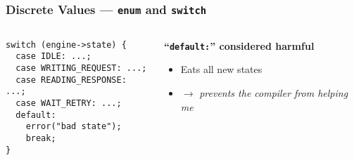 \begin{frame}[fragile]
  \frametitle{Discrete Values --- \texttt{enum} and \texttt{switch}}

  \begin{columns}[t]

    \begin{column}{.5\textwidth}

      \begin{block}{}
\begin{verbatim}
switch (engine->state) {
  case IDLE: ...;
  case WRITING_REQUEST: ...;
  case READING_RESPONSE: ...;
  case WAIT_RETRY: ...;
  default:
    error("bad state");
    break;
}
\end{verbatim}
      \end{block}

    \end{column}

    \begin{column}{.4\textwidth}

      \textbf{``\texttt{default:}'' considered harmful}

      \begin{itemize}
      \item Eats all new states
      \item $\to$ \textit{prevents the compiler from helping me}
      \end{itemize}
      
    \end{column}
  
  \end{columns}

\end{frame}

